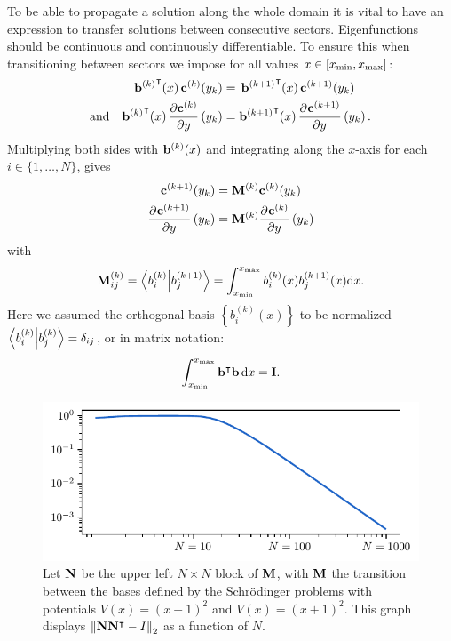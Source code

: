 To be able to propagate a solution along the whole domain it is vital to have an expression to transfer solutions between consecutive sectors. Eigenfunctions should be continuous and continuously differentiable. To ensure this when transitioning between sectors we impose for all values $x \in [{x_{\text{min}}}, {x_{\text{max}}}]$:
\begin{align*}
  {\vb{b}^{(k)}}^\intercal(x) \, \vb{c}^{(k)}(y_k)                   & =\, {\vb{b}^{(k+1)}}^\intercal(x) \, \vb{c}^{(k+1)}(y_k)                            \\
  \text{and}\quad
  {\vb{b}^{(k)}}^\intercal(x)\,\pdv{\vb{c}^{(k)}}{y}\left(y_k\right) & = {\vb{b}^{(k+1)}}^\intercal(x)\,\pdv[]{\vb{c}^{(k+1)}}{y}\left(y_k\right) \text{.}
\end{align*}
Multiplying both sides with $\vb{b}^{(k)}(x)$ and integrating along the $x$-axis for each $i \in \{1, \dots, N\}$, gives
\begin{align*}
  \vb{c}^{(k+1)}(y_k)                       & = \vb{M}^{(k)} \vb{c}^{(k)}(y_k)                       \\
  \pdv[]{\vb{c}^{(k+1)}}{y}\left(y_k\right) & = \vb{M}^{(k)} \pdv[]{\vb{c}^{(k)}}{y}\left(y_k\right)
\end{align*}
with
$$
  \vb{M}^{(k)}_{ij} = \bra{b_{i}^{(k)}}\ket{b_{j}^{(k+1)}} = \int_{x_{\text{min}}}^{x_{\text{max}}} b_i^{(k)}(x) b_j^{(k+1)}(x) \dd x \text{.}
$$
Here we assumed the orthogonal basis $\left\{b_i^{(k)}(x)\right\}$ to be normalized $\bra{b_{i}^{(k)}}\ket{b_{j}^{(k)}} = \delta_{ij}$, or in matrix notation:
\begin{equation}\label{equ:c3_b_orthonormal}
  \int_{x_{\text{min}}}^{x_{\text{max}}} {\vb{b}}^\intercal \vb{b}\,\dd x = \vb{I}\text{.}
\end{equation}

\begin{figure}
  \begin{center}
    \includegraphics[width=\textwidth]{img/chapter3/orthogonal_m.pdf}
  \end{center}
  \caption{Let $\vb{N}$ be the upper left $N \times N$ block of $\vb{M}$, with $\vb{M}$ the transition between the bases defined by the Schrödinger problems with potentials $V(x) = (x-1)^2$ and $V(x) = (x+1)^2$. This graph displays $\left\| \vb{N} {\vb{N}}^\intercal - I \right\|_2$ as a function of $N$.}\label{fig:c3_orthogonal_m}
\end{figure}

